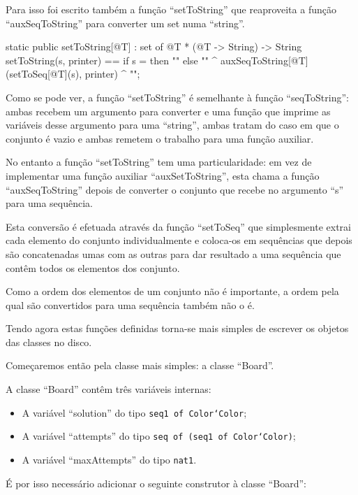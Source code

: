 Para isso foi escrito também a função ``setToString'' que reaproveita
a função ``auxSeqToString'' para converter um set numa ``string''.

\begin{vdm_al}
  static public setToString[@T] : set of @T * (@T -> String) -> String
  setToString(s, printer) ==
    if s = {} then "{}"
    else "{" ^ auxSeqToString[@T](setToSeq[@T](s), printer) ^ "}";
\end{vdm_al}

Como se pode ver, a função ``setToString'' é semelhante à função
``seqToString'': ambas recebem um argumento para converter e uma
função que imprime as variáveis desse argumento para uma ``string'',
ambas tratam do caso em que o conjunto é vazio e ambas remetem o
trabalho para uma função auxiliar.

No entanto a função ``setToString'' tem uma particularidade: em vez de
implementar uma função auxiliar ``auxSetToString'', esta chama a
função ``auxSeqToString'' depois de converter o conjunto que recebe no
argumento ``s'' para uma sequência.

Esta conversão é efetuada através da função ``setToSeq'' que
simplesmente extrai cada elemento do conjunto individualmente e
coloca-os em sequências que depois são concatenadas umas com as outras
para dar resultado a uma sequência que contêm todos os elementos dos
conjunto.

Como a ordem dos elementos de um conjunto não é importante, a ordem
pela qual são convertidos para uma sequência também não o é.

Tendo agora estas funções definidas torna-se mais simples de escrever
os objetos das classes no disco.

Começaremos então pela classe mais simples: a classe ``Board''.

A classe ``Board'' contêm três variáveis internas:

\begin{itemize}
\item A variável ``solution'' do tipo \texttt{seq1 of Color`Color};
\item A variável ``attempts'' do tipo \texttt{seq of (seq1 of Color`Color)};
\item A variável ``maxAttempts'' do tipo \texttt{nat1}.
\end{itemize}

É por isso necessário adicionar o seguinte construtor à classe
``Board'':

